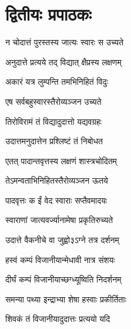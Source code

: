 \cleardoublepage
\chapter{द्वितीयः प्रपाठकः}

\resetShloka

{न चोदात्तं पुरस्तस्य जात्यः स्वारः स उच्यते}

{अनुदात्ते प्रत्यये तद् विद्यात् क्षैप्रस्य लक्षणम्}

{अकारं यत्र लुम्पन्ति तमभिनिहितं विदुः}

{एष सर्वबहुस्वारस्तैरोव्यञ्जन उच्यते}

{तिरोविरामं तं विद्यादुदात्तो यद्यवग्रहः}

{उदात्तमनुदात्तेन प्रश्लिष्टं तं निबोधत}

{एतत् पादान्तवृत्तस्य लक्षणं शास्त्रचोदितम्}

{तेऽमन्वताभिनिहितस्तैरोव्यञ्जन ऊतये}

{पादवृत्तः क ईं वेद स्वाराः सप्तैवमादयः}

{स्वाराणां जात्यवर्ज्यानामेषा प्रकृतिरुच्यते}

{उदात्ते वैकनीचे वा जुह्वो३ऽग्ने तत्र दर्शनम्}

\closesub

\resetShloka

{हस्वं कम्पं विजानीयान्मेधावी नात्र संशयः}

{दीर्घं कम्पं विजानीयाच्छग्ध्यूष्विति निदर्शनम्}

{समन्या पथ्या इन्द्राभ्या शेषा हस्वाः प्रकीर्तिताः}

{शिवकं तं विजानीयादुदात्तः प्रत्ययो यदि}

